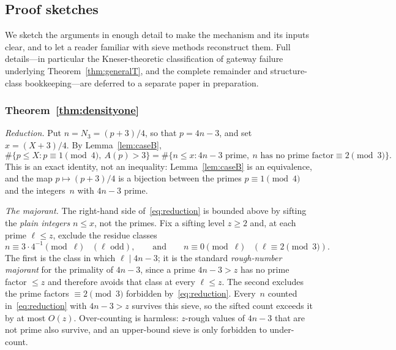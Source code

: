 \documentclass[12pt]{amsart}
\theoremstyle{definition}
\theoremstyle{remark}
\begin{document}
\subsection{Proof sketches}

We sketch the arguments in enough detail to make the mechanism and its
inputs clear, and to let a reader familiar with sieve methods
reconstruct them.  Full details---in particular the Kneser-theoretic
classification of gateway failure underlying
Theorem~\ref{thm:generalT}, and the complete remainder and
structure-class bookkeeping---are deferred to a separate paper in
preparation.

\subsubsection*{Theorem~\ref{thm:densityone}}

\emph{Reduction.}
Put $n = N_3 = (p+3)/4$, so that $p = 4n - 3$, and set
$x = (X+3)/4$.  By Lemma~\ref{lem:caseB},
\begin{equation}\label{eq:reduction}
  \#\{p \leq X : p \equiv 1 \!\!\pmod 4,\ A(p) > 3\}
  = \#\{n \leq x : 4n-3 \text{ prime},\
    n \text{ has no prime factor} \equiv 2 \!\!\pmod 3\}.
\end{equation}
This is an exact identity, not an inequality: Lemma~\ref{lem:caseB} is
an equivalence, and the map $p \mapsto (p+3)/4$ is a bijection between
the primes $p \equiv 1 \pmod 4$ and the integers~$n$ with $4n-3$ prime.

\emph{The majorant.}
The right-hand side of~\eqref{eq:reduction} is bounded above by sifting
the \emph{plain integers} $n \leq x$, not the primes.  Fix a sifting
level $z \geq 2$ and, at each prime $\ell \leq z$, exclude the residue
classes
\[
  n \equiv 3 \cdot 4^{-1} \!\!\pmod \ell \quad (\ell \text{ odd}),
  \qquad\text{and}\qquad
  n \equiv 0 \!\!\pmod \ell \quad (\ell \equiv 2 \!\!\pmod 3).
\]
The first is the class in which $\ell \mid 4n-3$; it is the standard
\emph{rough-number majorant} for the primality of $4n-3$, since a prime
$4n-3 > z$ has no prime factor $\leq z$ and therefore avoids that class
at every $\ell \leq z$.  The second excludes the prime factors
$\equiv 2 \pmod 3$ forbidden by~\eqref{eq:reduction}.  Every~$n$
counted in~\eqref{eq:reduction} with $4n-3 > z$ survives this sieve, so
the sifted count exceeds it by at most $O(z)$.  Over-counting is
harmless: $z$-rough values of $4n-3$ that are not prime also survive,
and an upper-bound sieve is only forbidden to under-count.
\end{document}
